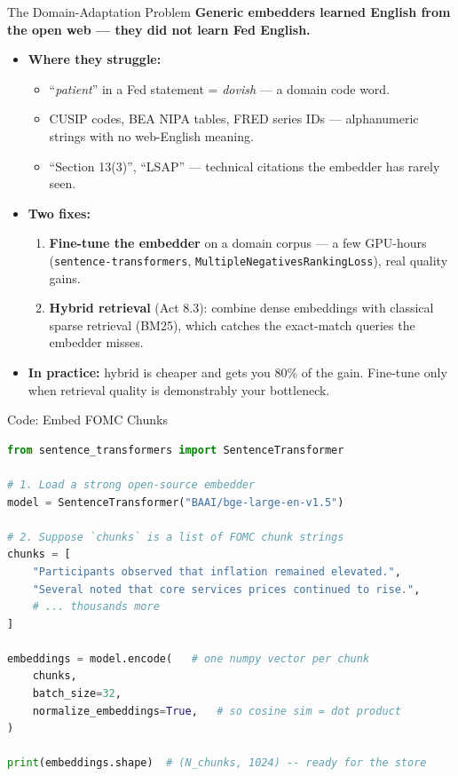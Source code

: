 \begin{frame}{The Domain-Adaptation Problem}
\textbf{Generic embedders learned English from the open web --- they did not learn Fed English.}

\medskip
\begin{itemize}
\item \textbf{Where they struggle:}
\begin{itemize}
    \item ``\emph{patient}'' in a Fed statement = \emph{dovish} --- a domain code word.
    \item CUSIP codes, BEA NIPA tables, FRED series IDs --- alphanumeric strings with no web-English meaning.
    \item ``Section 13(3)'', ``LSAP'' --- technical citations the embedder has rarely seen.
\end{itemize}

\medskip
\item \textbf{Two fixes:}
\begin{enumerate}
    \item \textbf{Fine-tune the embedder} on a domain corpus --- a few GPU-hours (\texttt{sentence-transformers}, \texttt{MultipleNegativesRankingLoss}), real quality gains.
    \item \textbf{Hybrid retrieval} (Act 8.3): combine dense embeddings with classical sparse retrieval (BM25), which catches the exact-match queries the embedder misses.
\end{enumerate}

\medskip
\item \textbf{In practice:} hybrid is cheaper and gets you 80\% of the gain. Fine-tune only when retrieval quality is demonstrably your bottleneck.
\end{itemize}
\end{frame}

\begin{frame}[fragile]{Code: Embed FOMC Chunks}
\begin{lstlisting}[language=Python, basicstyle=\ttfamily\footnotesize]
from sentence_transformers import SentenceTransformer

# 1. Load a strong open-source embedder
model = SentenceTransformer("BAAI/bge-large-en-v1.5")

# 2. Suppose `chunks` is a list of FOMC chunk strings
chunks = [
    "Participants observed that inflation remained elevated.",
    "Several noted that core services prices continued to rise.",
    # ... thousands more
]

embeddings = model.encode(   # one numpy vector per chunk
    chunks,
    batch_size=32,
    normalize_embeddings=True,   # so cosine sim = dot product
)

print(embeddings.shape)  # (N_chunks, 1024) -- ready for the store
\end{lstlisting}
\end{frame}

